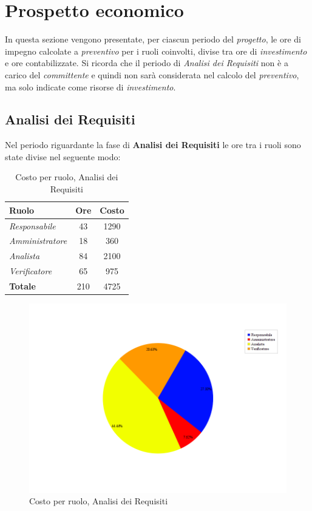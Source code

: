 \section{Prospetto economico}
In questa sezione vengono presentate, per ciascun periodo del \textit{progetto}, le ore di impegno calcolate a \textit{preventivo} per i ruoli coinvolti, divise tra ore di \textit{investimento} e ore contabilizzate. Si ricorda che il periodo di \textit{Analisi dei Requisiti} non è a carico del \textit{committente} e quindi non sarà considerata nel calcolo del \textit{preventivo}, ma solo indicate come risorse di \textit{investimento}.
\subsection{Analisi dei Requisiti}
Nel periodo riguardante la fase di \textbf{Analisi dei Requisiti} le ore tra i ruoli sono state divise nel seguente modo:

\begin{table}[H]
	\begin{center}
		\begin{tabular}{|l|c|c|}
			\hline
			\textbf{Ruolo}	& \textbf{Ore} & \textbf{Costo} \\
			\hline
			\textit{Responsabile	}&	43	&	 1290	\\
			\hline
			\textit{Amministratore}	&	18	&	 360	\\
			\hline
			\textit{Analista}		&	84	&	 2100	\\
			\hline
			\textit{Verificatore}	&	65	&	 975	\\
			\hline
			\textbf{Totale} &	210	&	4725	\\
			\hline
		\end{tabular}
	\end{center}
	\caption{Costo per ruolo, Analisi dei Requisiti}
\end{table}

\begin{figure}[H]
	\centering
	\includegraphics[scale=0.4]{immagini/Grafi/CostoAR}
	\caption{Costo per ruolo, Analisi dei Requisiti}
\end{figure}

